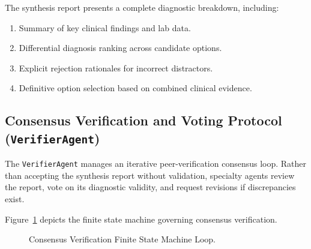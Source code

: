 The synthesis report presents a complete diagnostic breakdown, including:
\begin{enumerate}
    \item Summary of key clinical findings and lab data.
    \item Differential diagnosis ranking across candidate options.
    \item Explicit rejection rationales for incorrect distractors.
    \item Definitive option selection based on combined clinical evidence.
\end{enumerate}

\subsection{Consensus Verification and Voting Protocol (\texttt{VerifierAgent})}

The \texttt{VerifierAgent} manages an iterative peer-verification consensus loop. Rather than accepting the synthesis report without validation, specialty agents review the report, vote on its diagnostic validity, and request revisions if discrepancies exist.

Figure~\ref{fig:verifier_fsm} depicts the finite state machine governing consensus verification.

\begin{figure}[htbp]
\centering
{}
\caption{Consensus Verification Finite State Machine Loop.}
\label{fig:verifier_fsm}
\end{figure}

